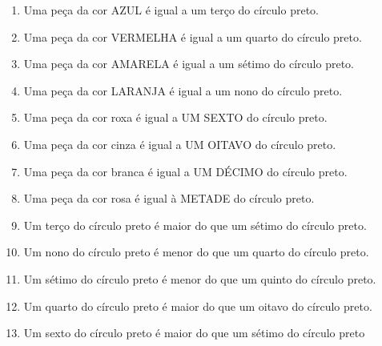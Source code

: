 \documentclass[10 pt,usenames,dvipsnames, oneside]{article}
\begin{document}
\begin{solucao}

\begin{enumerate}[label=\alph*)]
 \item Uma peça da cor AZUL é igual a um terço do círculo preto.
 \item    Uma peça da cor VERMELHA é igual a um quarto do círculo preto.
 \item    Uma peça da cor AMARELA é igual a um sétimo do círculo preto.
 \item    Uma peça da cor LARANJA é igual a um nono do círculo preto.
 \item    Uma peça da cor roxa é igual a UM SEXTO do círculo preto.
 \item    Uma peça da cor cinza é igual a UM OITAVO do círculo preto.
 \item    Uma peça da cor branca é igual a UM DÉCIMO do círculo preto.
 \item    Uma peça da cor rosa é igual à METADE do círculo preto.
 \item    Um terço do círculo preto é maior do que um sétimo do círculo preto.
 \item    Um nono do círculo preto é menor do que um quarto do círculo preto.
 \item    Um sétimo do círculo preto é menor do que um quinto do círculo preto.
 \item    Um quarto do círculo preto é maior do que um oitavo do círculo preto.
 \item    Um sexto do círculo preto é maior do que um sétimo do círculo preto
\end{enumerate}

\end{solucao}
\fi
\end{document}
